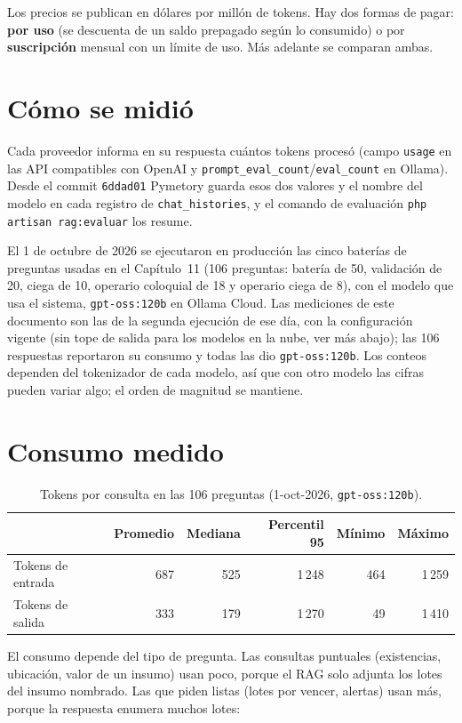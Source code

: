 \documentclass[letterpaper,11pt]{article}
\begin{document}
Los precios se publican en dólares por millón de tokens. Hay dos formas de pagar: \textbf{por uso} (se descuenta de un saldo prepagado según lo consumido) o por \textbf{suscripción} mensual con un límite de uso. Más adelante se comparan ambas.

\section{Cómo se midió}

Cada proveedor informa en su respuesta cuántos tokens procesó (campo \texttt{usage} en las API compatibles con OpenAI y \texttt{prompt\_eval\_count}/\texttt{eval\_count} en Ollama). Desde el commit \texttt{6ddad01} Pymetory guarda esos dos valores y el nombre del modelo en cada registro de \texttt{chat\_histories}, y el comando de evaluación \texttt{php artisan rag:evaluar} los resume.

El 1 de octubre de 2026 se ejecutaron en producción las cinco baterías de preguntas usadas en el Capítulo~11 (106 preguntas: batería de 50, validación de 20, ciega de 10, operario coloquial de 18 y operario ciega de 8), con el modelo que usa el sistema, \texttt{gpt-oss:120b} en Ollama Cloud. Las mediciones de este documento son las de la segunda ejecución de ese día, con la configuración vigente (sin tope de salida para los modelos en la nube, ver más abajo); las 106 respuestas reportaron su consumo y todas las dio \texttt{gpt-oss:120b}. Los conteos dependen del tokenizador de cada modelo, así que con otro modelo las cifras pueden variar algo; el orden de magnitud se mantiene.

\section{Consumo medido}

\begin{table}[H]
\centering
\begin{tabular}{lrrrrr}
\toprule
 & Promedio & Mediana & Percentil 95 & Mínimo & Máximo \\
\midrule
Tokens de entrada & 687 & 525 & 1\,248 & 464 & 1\,259 \\
Tokens de salida  & 333 & 179 & 1\,270 & 49 & 1\,410 \\
\bottomrule
\end{tabular}
\caption{Tokens por consulta en las 106 preguntas (1-oct-2026, \texttt{gpt-oss:120b}).}
\end{table}

El consumo depende del tipo de pregunta. Las consultas puntuales (existencias, ubicación, valor de un insumo) usan poco, porque el RAG solo adjunta los lotes del insumo nombrado. Las que piden listas (lotes por vencer, alertas) usan más, porque la respuesta enumera muchos lotes:
\end{document}
